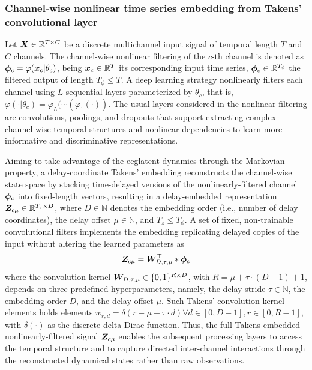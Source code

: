 \subsubsection{Channel-wise nonlinear time series embedding from Takens' convolutional layer}\label{sec:takens}

Let ${\bm{X}} \in \mathbb{R}^{T \times C}$ be a discrete multichannel input signal of temporal length $T$ and $C$ channels. The channel-wise nonlinear filtering of the $c$-th channel is denoted as ${\bm{\phi}}_c=\varphi({\bm{x}}_c|\theta_c)$, being ${\bm{x}}_c\in\mathbb{R}^T$ its corresponding input time series, ${\bm{\phi}}_c\in\mathbb{R}^{T_{\phi}}$ the filtered output of length $T_{\phi}\leq T$. A deep learning strategy nonlinearly filters each channel using $L$ sequential layers parameterized by $\theta_c$, that is, $\varphi(\cdot|\theta_c)=\varphi_{L}(\cdots(\varphi_1(\cdot))$. The usual layers considered in the nonlinear filtering are convolutions, poolings, and dropouts that support extracting complex channel-wise temporal structures and nonlinear dependencies to learn more informative and discriminative representations.

Aiming to take advantage of the \gls{eeg}latent dynamics through the Markovian property, a delay-coordinate Takens' embedding reconstructs the channel-wise state space by stacking time-delayed versions of the nonlinearly-filtered channel ${\bm{\phi}}_c$ into fixed-length vectors, resulting in a delay-embedded representation ${\bm{Z}}_{c\mu} \in \mathbb{R}^{T_z \times D}$, where $D \in \mathbb{N}$ denotes the embedding order (i.e., number of delay coordinates), the delay offset $\mu \in \mathbb{N}$, and $T_z\leq T_\phi$. A set of fixed, non-trainable convolutional filters implements the embedding replicating delayed copies of the input without altering the learned parameters as 
\begin{equation}\label{eq:z_takens}
{\bm{Z}}_{c\mu}={\bm{W}}_{D,\tau,\mu}^\top*{\bm{\phi}}_c
\end{equation}
{where the convolution kernel ${\bm{W}}_{D,\tau,\mu}\in\{0,1\}^{R \times D}$, with $R = \mu + \tau \cdot (D - 1) + 1$,} depends on three predefined hyperparameters, namely, the delay stride $\tau \in \mathbb{N}$, the embedding order $D$, and the delay offset $\mu$. Such Takens' convolution kernel elements holds elements 
$w_{r,d}=\delta(r - \mu - \tau \cdot d)\forall d \in [0, D-1], r \in [0, {R}-1]$, with $\delta(\cdot)$ as the discrete delta Dirac function. Thus, the full Takens-embedded nonlinearly-filtered signal ${\bm{Z}}_{c\mu}$ enables the subsequent processing layers to access the temporal structure and to capture directed inter-channel interactions through the reconstructed dynamical states rather than raw observations.

